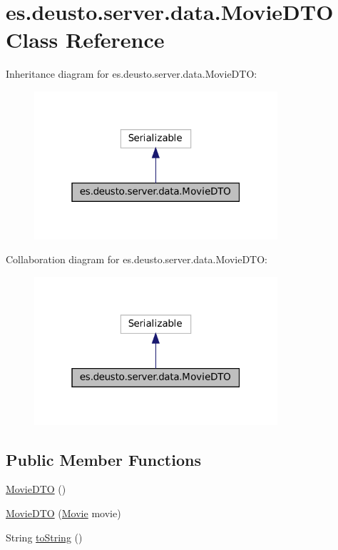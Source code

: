 \hypertarget{classes_1_1deusto_1_1server_1_1data_1_1_movie_d_t_o}{}\section{es.\+deusto.\+server.\+data.\+Movie\+D\+TO Class Reference}
\label{classes_1_1deusto_1_1server_1_1data_1_1_movie_d_t_o}


Inheritance diagram for es.\+deusto.\+server.\+data.\+Movie\+D\+TO\+:\nopagebreak
\begin{figure}[H]
\begin{center}
\leavevmode
\includegraphics[width=256pt]{classes_1_1deusto_1_1server_1_1data_1_1_movie_d_t_o__inherit__graph}
\end{center}
\end{figure}


Collaboration diagram for es.\+deusto.\+server.\+data.\+Movie\+D\+TO\+:\nopagebreak
\begin{figure}[H]
\begin{center}
\leavevmode
\includegraphics[width=256pt]{classes_1_1deusto_1_1server_1_1data_1_1_movie_d_t_o__coll__graph}
\end{center}
\end{figure}
\subsection*{Public Member Functions}
\begin{DoxyCompactItemize}
\item 
\mbox{\hyperlink{classes_1_1deusto_1_1server_1_1data_1_1_movie_d_t_o_a8dab5027de00475ceb896ad89af993b7}{Movie\+D\+TO}} ()
\item 
\mbox{\hyperlink{classes_1_1deusto_1_1server_1_1data_1_1_movie_d_t_o_ad09b9cd627c8906f7ab7fe86d09b9e75}{Movie\+D\+TO}} (\mbox{\hyperlink{classes_1_1deusto_1_1server_1_1jdo_1_1_movie}{Movie}} movie)
\item 
String \mbox{\hyperlink{classes_1_1deusto_1_1server_1_1data_1_1_movie_d_t_o_aa20cf7813b2b64f17cf05deb7eb8479c}{to\+String}} ()
\end{DoxyCompactItemize}

